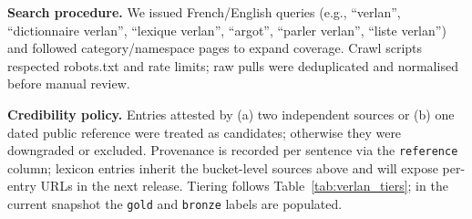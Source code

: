 \documentclass[12pt]{article}
\begin{document}
\noindent \textbf{Search procedure.} We issued French/English queries (e.g., ``verlan'', ``dictionnaire verlan'', ``lexique verlan'', ``argot'', ``parler verlan'', ``liste verlan'') and followed category/namespace pages to expand coverage. Crawl scripts respected robots.txt and rate limits; raw pulls were deduplicated and normalised before manual review.

\noindent \textbf{Credibility policy.} Entries attested by (a) two independent sources or (b) one dated public reference were treated as candidates; otherwise they were downgraded or excluded. Provenance is recorded per sentence via the \texttt{reference} column; lexicon entries inherit the bucket-level sources above and will expose per-entry URLs in the next release. Tiering follows Table~\ref{tab:verlan_tiers}; in the current snapshot the \texttt{gold} and \texttt{bronze} labels are populated.

\end{document}
